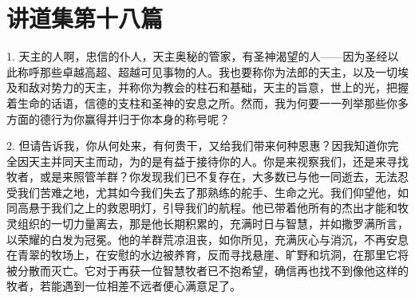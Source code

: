 
\section{讲道集第十八篇}

\par

\par

\par

1. 天主的人啊，忠信的仆人，天主奥秘的管家，有圣神渴望的人——因为圣经以此称呼那些卓越高超、超越可见事物的人。我也要称你为法郎的天主，以及一切埃及和敌对势力的天主，并称你为教会的柱石和基础，天主的旨意，世上的光，把握着生命的话语，信德的支柱和圣神的安息之所。然而，我为何要一一列举那些你多方面的德行为你赢得并归于你本身的称号呢？\par

2. 但请告诉我，你从何处来，有何贵干，又给我们带来何种恩惠？因我知道你完全因天主并同天主而动，为的是有益于接待你的人。你是来视察我们，还是来寻找牧者，或是来照管羊群？你发现我们已不复存在，大多数已与他一同逝去，无法忍受我们苦难之地，尤其如今我们失去了那熟练的舵手、生命之光。我们仰望他，如同高悬于我们之上的救恩明灯，引导我们的航程。他已带着他所有的杰出才能和牧灵组织的一切力量离去，那是他长期积累的，充满时日与智慧，并如撒罗满所言，以荣耀的白发为冠冕。他的羊群荒凉沮丧，如你所见，充满灰心与消沉，不再安息在青翠的牧场上，在安慰的水边被养育，反而寻找悬崖、旷野和坑洞，在那里它将被分散而灭亡。它对于再获一位智慧牧者已不抱希望，确信再也找不到像他这样的牧者，若能遇到一位相差不远者便心满意足了。\par

